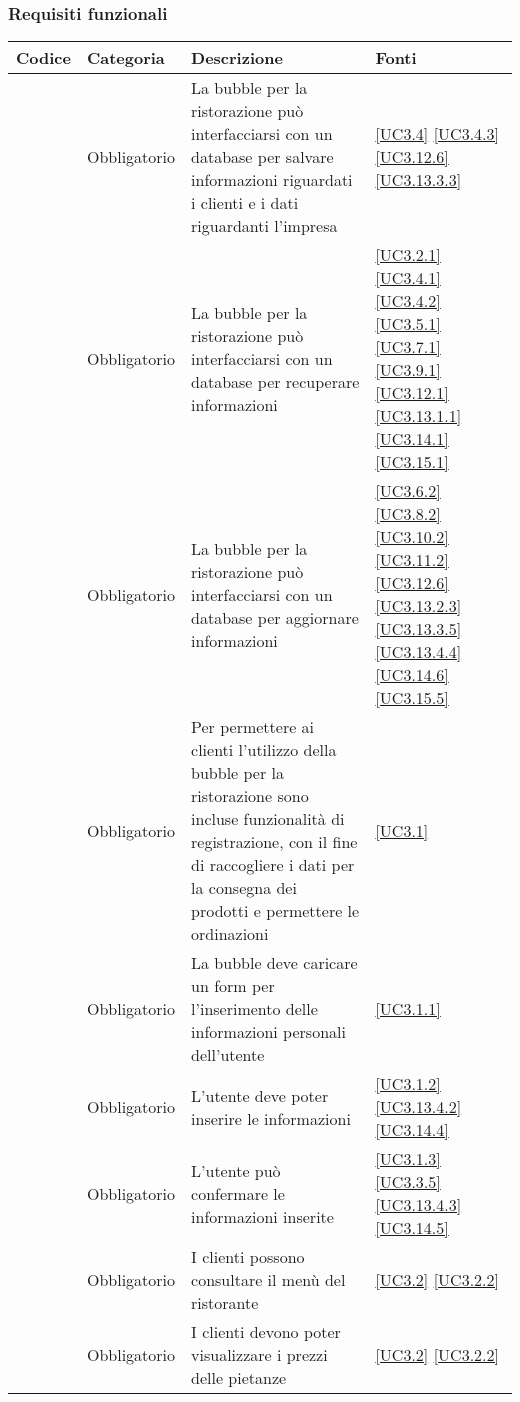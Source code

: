 \subsubsection{Requisiti funzionali}

\begin{longtable}{|P{1.5cm}|P{2.5cm}|P{6.5cm}|P{2.5cm}|}
	\hline \textbf{Codice} & \textbf{Categoria} & \textbf{Descrizione} & \textbf{Fonti} \\
	
	\hline \RequisitoObF\label{L21} & Obbligatorio & La bubble per la ristorazione può interfacciarsi con un database per salvare informazioni riguardati i clienti e i dati riguardanti l'impresa & \ref{UC3.4} \ref{UC3.4.3} \ref{UC3.12.6} \ref{UC3.13.3.3} \\
	\hline \RequisitoObF\label{L61} & Obbligatorio & La bubble per la ristorazione può interfacciarsi con un database per recuperare informazioni & \ref{UC3.2.1} \ref{UC3.4.1} \ref{UC3.4.2} \ref{UC3.5.1} \ref{UC3.7.1}  \ref{UC3.9.1} \ref{UC3.12.1} \ref{UC3.13.1.1} \ref{UC3.14.1} \ref{UC3.15.1} \\
	\hline \RequisitoObF\label{L62} & Obbligatorio & La bubble per la ristorazione può interfacciarsi con un database per aggiornare informazioni & \ref{UC3.6.2} \ref{UC3.8.2} \ref{UC3.10.2} \ref{UC3.11.2} \ref{UC3.12.6}  \ref{UC3.13.2.3} \ref{UC3.13.3.5} \ref{UC3.13.4.4} \ref{UC3.14.6} \ref{UC3.15.5} \\	
	\hline \RequisitoObF\label{L22} & Obbligatorio & Per permettere ai clienti l'utilizzo della bubble per la ristorazione sono incluse funzionalità di registrazione, con il fine di raccogliere i dati per la consegna dei prodotti e permettere le ordinazioni & \ref{UC3.1} \\
	\hline \RequisitoObF\label{L96} & Obbligatorio & La bubble deve caricare un form per l'inserimento delle informazioni personali dell'utente & \ref{UC3.1.1} \\
	\hline \RequisitoObF\label{L97} & Obbligatorio & L'utente deve poter inserire le informazioni & \ref{UC3.1.2} \ref{UC3.13.4.2} \ref{UC3.14.4}\\
	\hline \RequisitoObF\label{L98} & Obbligatorio & L'utente può confermare le informazioni inserite & \ref{UC3.1.3} \ref{UC3.3.5} \ref{UC3.13.4.3} \ref{UC3.14.5}\\
	\hline \RequisitoObF\label{L23} & Obbligatorio & I clienti possono consultare il menù del ristorante & \ref{UC3.2} \ref{UC3.2.2}\\
	\hline \RequisitoObF \label{L68} & Obbligatorio & I clienti devono poter visualizzare i prezzi delle pietanze & \ref{UC3.2} \ref{UC3.2.2}\\

\end{longtable}

